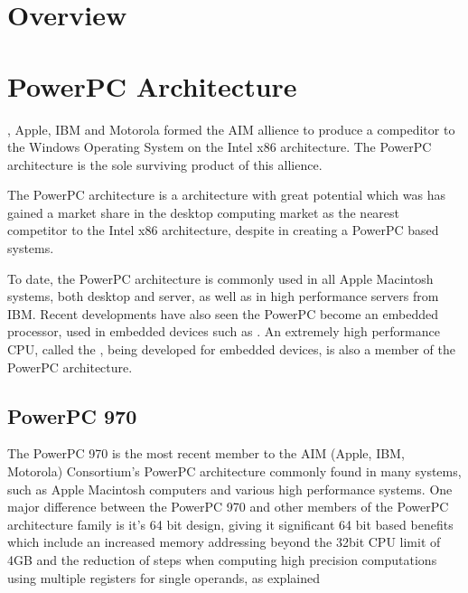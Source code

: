 \documentclass[a4paper,12pt]{article}
\begin{document}
\tableofcontents

\section{Overview}

\section{PowerPC Architecture}

\cite[In 1991]{a3}, Apple, IBM and Motorola formed the AIM allience to
produce a compeditor to the Windows Operating System on the Intel x86
architecture. The PowerPC architecture is the sole surviving product of
this allience.


The PowerPC architecture is a \cite[RISC based]{a3} architecture with
great potential which was has gained a market share in the desktop
computing market as the nearest competitor to the Intel x86
architecture, despite \cite[troubles experienced by numerous PC
manufactures, such as IBM]{a3} in creating a PowerPC based
systems.


To date, the PowerPC architecture is commonly used in all Apple
Macintosh systems, both desktop and server, as well as in high
performance servers from IBM. Recent developments have also seen the
PowerPC become an embedded processor, used in embedded devices such as
\cite[the Nintendo CameCube, the Microsoft Xbox 2, Cisco dedicated 
networking hardware, and the TiVo set top box.]{a3}. An extremely high
performance CPU, called the \cite[Cell Technology]{a3}, being developed for
embedded devices, is also a member of the PowerPC architecture.

\subsection{PowerPC 970}

The PowerPC 970 is the most recent member to the AIM (Apple, IBM,
Motorola) Consortium's PowerPC architecture commonly found in many 
systems, such as Apple Macintosh computers and various high 
performance systems. One major difference between the PowerPC 970 and other 
members of the PowerPC architecture family is it's 64 bit design, 
giving it significant 64 bit based benefits which include an 
increased memory addressing beyond the 32bit CPU limit of 4GB and 
the reduction of steps when computing high precision computations 
using multiple registers for single operands, as explained
\cite[here]{a6}
\end{document}
